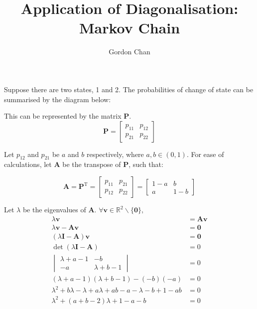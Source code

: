 \documentclass[a4paper]{article}
\title{Application of Diagonalisation: Markov Chain}
\author{Gordon Chan}
\newcommand{\vv}{\mathbf}
\begin{document}
\maketitle
Suppose there are two states, 1 and 2. The probabilities of change of state can be summarised by the diagram below:
\begin{center}
\end{center}

This can be represented by the matrix \(\vv P\).
\[\vv P=\begin{bmatrix}
	p_{11}&p_{12}\\
	p_{21}&p_{22}
\end{bmatrix}\]

Let \(p_{12}\) and \(p_{21}\) be \(a\) and \(b\) respectively, where \(a,b\in(0,1)\). For ease of calculations, let \(\vv A\) be the transpose of \(\vv P\), such that:

\[\vv A=\vv P^{\mathrm T}=
\begin{bmatrix}
	p_{11}&p_{21}\\
	p_{12}&p_{22}
\end{bmatrix}=
\begin{bmatrix}
	1-a&b\\
	a&1-b
\end{bmatrix}\]

Let \(\lambda\) be the eigenvalues of \(\vv A\). \(\forall\vv v\in\mathbb R^2\backslash\{\vv0\}\),
\[\begin{aligned}
	\lambda\vv v&=\vv A\vv v\\
	\lambda\vv v-\vv A\vv v&=\vv0\\
	(\lambda\vv I-\vv A)\vv v&=\vv0\\
	\det(\lambda\vv I-\vv A)&=0\\
	\begin{vmatrix}
		\lambda+a-1&-b\\
		-a&\lambda+b-1
	\end{vmatrix}&=0\\
	(\lambda+a-1)(\lambda+b-1)-(-b)(-a)&=0\\
	\lambda^2+b\lambda-\lambda+a\lambda+ab-a-\lambda-b+1-ab&=0\\
	\lambda^2+(a+b-2)\lambda+1-a-b&=0\\
\end{aligned}\]
\end{document}
